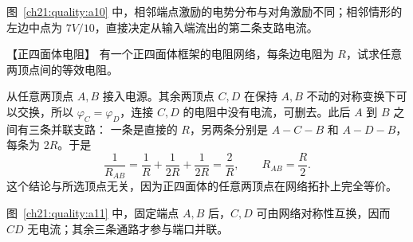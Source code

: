 {\begin{xesolution}
图~\ref{ch21:quality:a10} 中，相邻端点激励的电势分布与对角激励不同；相邻情形的左边中点为 $7V/10$，直接决定从输入端流出的第二条支路电流。
\end{xesolution}



\begin{origexamplebox}{【正四面体电阻】}\label{ch21:ex:s37-6-3}
有一个正四面体框架的电阻网络，每条边电阻为 $R$，试求任意两顶点间的等效电阻。
\par\noindent\begin{minipage}{\linewidth}
\tetrahedronProblemFigure
{}
\end{minipage}\par\medskip
\end{origexamplebox}\par\nopagebreak[4]


\begin{xesolution}
\begin{center}\begin{minipage}{.96\linewidth}\centering
{}
\end{minipage}\end{center}

从任意两顶点 $A,B$ 接入电源。其余两顶点 $C,D$ 在保持 $A,B$ 不动的对称变换下可以交换，所以
$\varphi_C=\varphi_D$，连接 $C,D$ 的电阻中没有电流，可删去。此后 $A$ 到 $B$ 之间有三条并联支路：
一条是直接的 $R$，另两条分别是 $A-C-B$ 和 $A-D-B$，每条为 $2R$。于是
\[
  \frac1{R_{AB}}=\frac1R+\frac1{2R}+\frac1{2R}=\frac2R,
  \qquad
  \boxed{R_{AB}=\frac R2}.
\]
这个结论与所选顶点无关，因为正四面体的任意两顶点在网络拓扑上完全等价。

图~\ref{ch21:quality:a11} 中，固定端点 $A,B$ 后，$C,D$ 可由网络对称性互换，因而 $CD$ 无电流；其余三条通路才参与端口并联。
\end{xesolution}



}
